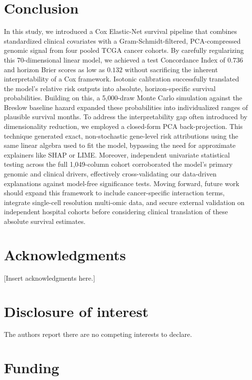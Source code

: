 \documentclass[10pt,a4paper]{article}
\begin{document}
\section{Conclusion}
In this study, we introduced a Cox Elastic-Net survival pipeline that combines standardized clinical covariates with a Gram-Schmidt-filtered, PCA-compressed genomic signal from four pooled TCGA cancer cohorts. By carefully regularizing this 70-dimensional linear model, we achieved a test Concordance Index of $0.736$ and horizon Brier scores as low as $0.132$ without sacrificing the inherent interpretability of a Cox framework. Isotonic calibration successfully translated the model's relative risk outputs into absolute, horizon-specific survival probabilities. Building on this, a 5,000-draw Monte Carlo simulation against the Breslow baseline hazard expanded these probabilities into individualized ranges of plausible survival months. To address the interpretability gap often introduced by dimensionality reduction, we employed a closed-form PCA back-projection. This technique generated exact, non-stochastic gene-level risk attributions using the same linear algebra used to fit the model, bypassing the need for approximate explainers like SHAP or LIME. Moreover, independent univariate statistical testing across the full 1,049-column cohort corroborated the model's primary genomic and clinical drivers, effectively cross-validating our data-driven explanations against model-free significance tests. Moving forward, future work should expand this framework to include cancer-specific interaction terms, integrate single-cell resolution multi-omic data, and secure external validation on independent hospital cohorts before considering clinical translation of these absolute survival estimates.
\section*{Acknowledgments}

[Insert acknowledgments here.]

\section*{Disclosure of interest}

The authors report there are no competing interests to declare.

\section*{Funding}
\end{document}
